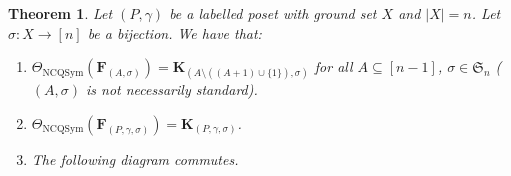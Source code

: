 \documentclass[11pt]{amsart}
\newtheorem{Theorem}{Theorem}[section]
\numberwithin{equation}{section}
\newcommand{\NCQSym}{\mathrm{NCQSym}}
\newcommand{\QSym}{\mathrm{QSym}}
\newcommand{\NCPeak}{\mathrm{NC}\Pi}
\newcommand{\scrY}{{\mathscr{Y}}}
\newcommand{\scrF}{{\mathscr{F}}}
\begin{document}
\begin{Theorem}\label{thm:theta} 
Let $(P,\gamma)$ be a labelled poset with ground set $X$ and $|X|=n$. Let $\sigma:X\to[n]$ be a bijection. 
	We have that:
	\begin{enumerate}
		\item $\Theta_{\NCQSym}(\mathbf{F}_{(A,\sigma)})=\mathbf{K}_{(A\setminus((A+1)\cup\{1\}),\sigma)}$ for all $A\subseteq[n-1]$, $\sigma\in\mathfrak{S}_n$ ($(A,\sigma)$ is not necessarily standard).
		\item $\Theta_{\NCQSym}(\mathbf{F}_{(P,\gamma,\sigma)})=\mathbf{K}_{(P,\gamma,\sigma)}$.
		\item The following diagram commutes.
		\begin{center}
		\end{center}
	\end{enumerate}
\end{Theorem}


\end{document}
